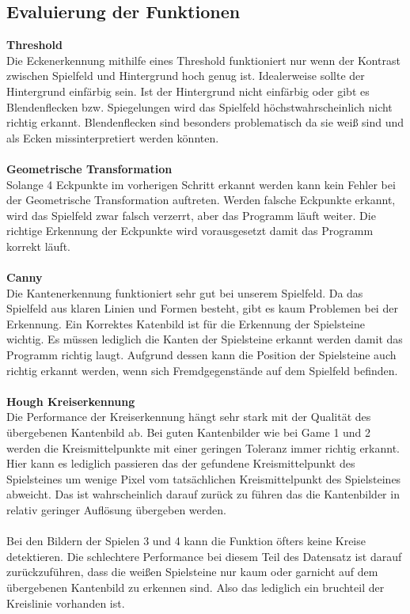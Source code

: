 \documentclass[paper=A4, deutsch]{scrartcl}
\begin{document}
\subsection{Evaluierung der Funktionen}
\textbf{Threshold}\\
Die Eckenerkennung mithilfe eines Threshold funktioniert nur wenn der Kontrast zwischen Spielfeld und Hintergrund hoch genug ist. Idealerweise sollte der Hintergrund einfärbig sein. Ist der Hintergrund nicht einfärbig oder gibt es Blendenflecken bzw. Spiegelungen wird das Spielfeld höchstwahrscheinlich nicht richtig erkannt.  Blendenflecken sind besonders problematisch da sie weiß sind und als Ecken missinterpretiert werden könnten.\\
\\
\textbf{Geometrische Transformation}\\
Solange 4 Eckpunkte im vorherigen Schritt erkannt werden kann kein Fehler bei der Geometrische Transformation auftreten. Werden falsche Eckpunkte erkannt, wird das Spielfeld zwar falsch verzerrt, aber das Programm läuft weiter. Die richtige Erkennung der Eckpunkte wird vorausgesetzt damit das Programm korrekt läuft.\\
\\
\textbf{Canny}\\
Die Kantenerkennung funktioniert sehr gut bei unserem Spielfeld. Da das Spielfeld aus klaren Linien und Formen besteht, gibt es kaum Problemen bei der Erkennung. Ein Korrektes Katenbild ist für die Erkennung der Spielsteine wichtig. Es müssen lediglich die Kanten der Spielsteine erkannt werden damit das Programm richtig laugt. Aufgrund dessen kann die Position der Spielsteine auch richtig erkannt werden, wenn sich Fremdgegenstände auf dem Spielfeld befinden. \\
\\
\textbf{Hough Kreiserkennung}\\
Die Performance der Kreiserkennung hängt sehr stark mit der Qualität des übergebenen Kantenbild ab. Bei guten Kantenbilder wie bei Game 1 und 2 werden die Kreismittelpunkte mit einer geringen Toleranz immer richtig erkannt. Hier kann es lediglich passieren das der gefundene Kreismittelpunkt des Spielsteines um wenige Pixel vom tatsächlichen Kreismittelpunkt des Spielsteines abweicht. Das ist wahrscheinlich darauf zurück zu führen das die Kantenbilder in relativ geringer Auflösung übergeben werden.\\
\\
Bei den Bildern der Spielen 3 und 4 kann die Funktion öfters keine Kreise detektieren. Die schlechtere Performance bei diesem Teil des Datensatz ist darauf zurückzuführen, dass die weißen Spielsteine nur kaum oder garnicht auf dem übergebenen Kantenbild zu erkennen sind. Also das lediglich ein bruchteil der Kreislinie vorhanden ist. \\
\end{document}
